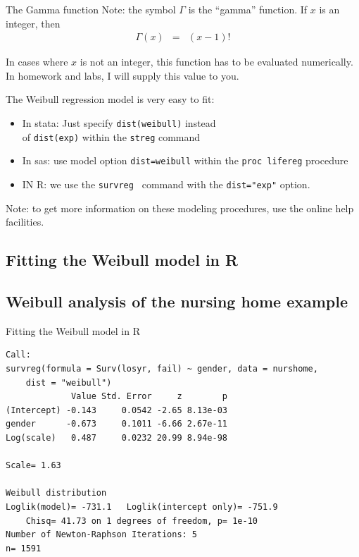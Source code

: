 \documentclass[envcountsect, 10pt, portrait, palatino]{beamer}
\begin{document}
\begin{frame}{The Gamma function}
Note:  the symbol $\Gamma$ is the ``gamma'' function.  If $x$ is an
integer, then
\begin{eqnarray*}
\Gamma(x) & = & (x-1)!
\end{eqnarray*}

In cases where $x$ is not an integer, this function has to be
evaluated numerically.  In homework and labs, I will supply this value
to you.

\vspace{0.4in}
The Weibull regression model is very easy to fit:
\begin{itemize}
\item In {\sc stata}:  Just specify {\tt dist(weibull)} instead \\
of {\tt dist(exp)} within the {\tt streg} command
\item In {\sc sas}: use model option {\tt dist=weibull} within the
{\tt proc lifereg} procedure
\item IN {\sc R}: we use the {\tt survreg } command with the {\tt dist="exp"} option.
\end{itemize}

Note: to get more information on these modeling procedures, use the
online help facilities.  
\end{frame} 
\subsection{Fitting the Weibull model in R}
\subsection{Weibull analysis of the nursing home example}
\begin{frame}[fragile]{Fitting the  Weibull  model in R}

\scriptsize
\begin{verbatim}
Call:
survreg(formula = Surv(losyr, fail) ~ gender, data = nurshome,
    dist = "weibull")
             Value Std. Error     z        p
(Intercept) -0.143     0.0542 -2.65 8.13e-03
gender      -0.673     0.1011 -6.66 2.67e-11
Log(scale)   0.487     0.0232 20.99 8.94e-98

Scale= 1.63

Weibull distribution
Loglik(model)= -731.1   Loglik(intercept only)= -751.9
	Chisq= 41.73 on 1 degrees of freedom, p= 1e-10
Number of Newton-Raphson Iterations: 5
n= 1591 
\end{verbatim}
\end{frame} 
\end{document}
